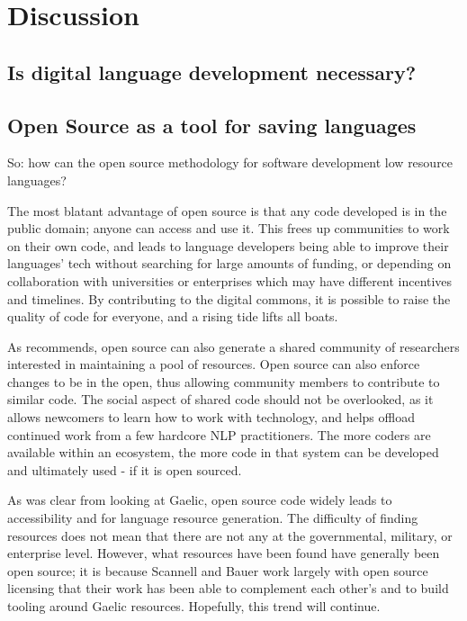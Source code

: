 \section{Discussion}
\label{sec:discussion}

\subsection{Is digital language development necessary?}


\subsection{Open Source as a tool for saving languages}

So: how can the open source methodology for software development low resource languages?

The most blatant advantage of open source is that any code developed is in the public domain; anyone can access and use it. This frees up communities to work on their own code, and leads to language developers being able to improve their languages' tech without searching for large amounts of funding, or depending on collaboration with universities or enterprises which may have different incentives and timelines. By contributing to the digital commons, it is possible to raise the quality of code for everyone, and a rising tide lifts all boats.

As \citet{streiter2006implementing} recommends, open source can also generate a shared community of researchers interested in maintaining a pool of resources. Open source can also enforce changes to be in the open, thus allowing community members to contribute to similar code. The social aspect of shared code should not be overlooked, as it allows newcomers to learn how to work with technology, and helps offload continued work from a few hardcore NLP practitioners. The more coders are available within an ecosystem, the more code in that system can be developed and ultimately used - if it is open sourced.

As was clear from looking at Gaelic, open source code widely leads to accessibility and for language resource generation. The difficulty of finding resources does not mean that there are not any at the governmental, military, or enterprise level. However, what resources have been found have generally been open source; it is because Scannell and Bauer work largely with open source licensing that their work has been able to complement each other's and to build tooling around Gaelic resources. Hopefully, this trend will continue.

